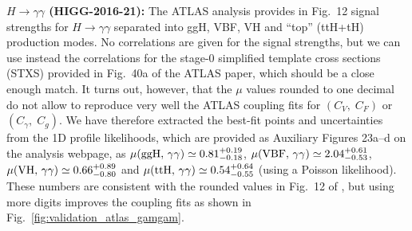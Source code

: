 {\bf\boldmath $H\to\gamma\gamma$ (HIGG-2016-21):}  
The ATLAS analysis \cite{Aaboud:2018xdt} provides in Fig.~12 signal strengths for $H\to\gamma\gamma$ separated into   
ggH, VBF, VH and ``top'' (ttH+tH) production modes. No correlations are given for the signal strengths, but we can  
use instead the correlations for the stage-0 simplified template cross sections (STXS) provided in Fig.~40a of the ATLAS 
paper, which should be a close enough match. It turns out, however, that the $\mu$ values rounded to one decimal 
do not allow to reproduce very well the ATLAS coupling fits for $(C_V,\;C_F)$ or $(C_\gamma,\;C_g)$. 
We have therefore extracted the best-fit points and uncertainties 
from the 1D profile likelihoods, which are provided as Auxiliary Figures 23a--d on the analysis webpage, 
as %
$\mu({\rm ggH},\,\gamma\gamma)\simeq 0.81^{+0.19}_{-0.18}$, 
$\mu({\rm VBF},\,\gamma\gamma)\simeq 2.04^{+0.61}_{-0.53}$, 
$\mu({\rm VH},\,\gamma\gamma)\simeq 0.66^{+0.89}_{-0.80}$ and 
$\mu({\rm ttH},\,\gamma\gamma)\simeq 0.54^{+0.64}_{-0.55}$ (using a Poisson likelihood).   
These numbers are consistent with the rounded values in Fig.~12 of \cite{Aaboud:2018xdt}, but using more digits 
improves the coupling fits as shown in Fig.~\ref{fig:validation_atlas_gamgam}.

